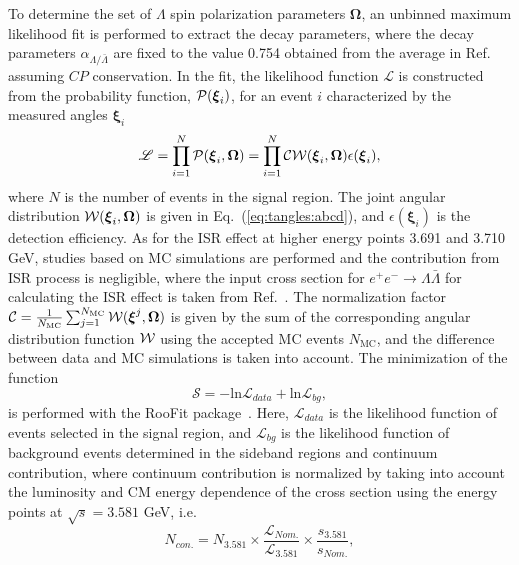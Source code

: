 \documentclass[a4paper,11pt]{article}
\begin{document}
To determine the set of $\Lambda$ spin polarization parameters $\boldsymbol{\Omega}$, an unbinned maximum likelihood fit is performed to extract the decay parameters, where the decay parameters $\alpha_{\Lambda/\bar\Lambda}$ are fixed to the value 0.754 obtained from the average in Ref.~\cite{BESIII:2022yprl} assuming $CP$ conservation.
In the fit,  the likelihood function $\mathscr{L}$ is constructed from the probability function, ${\cal{P}}({\boldsymbol{\xi}}_i)$, for an event $i$ characterized by the measured angles $\boldsymbol{\xi}_i$
\begin{equation}
\mathscr{L} = \prod_{i=1}^N {\cal{P}}({\boldsymbol{\xi}}_i, {\boldsymbol{\Omega}}) = \prod_{i=1}^N {\cal{C}}{\cal{W}}({\boldsymbol{\xi}}_i, {\boldsymbol{\Omega}})\epsilon(\boldsymbol{\xi}_i), 
\end{equation}
where $N$ is the number of events in the signal region. The joint angular distribution ${\cal{W}}({\boldsymbol{\xi}}_i, {\boldsymbol{\Omega}})$ is given in Eq.~(\ref{eq:tangles:abcd}), and $\epsilon(\boldsymbol{\xi}_i)$ is the detection efficiency.
As for the ISR effect at higher energy points {3.691 and 3.710 GeV, studies based on MC simulations are performed and the contribution from ISR process is negligible, where the input cross section for $e^+e^-\to\Lambda\bar\Lambda$ for calculating the ISR effect is taken from Ref.~\cite{borncs}.} 
The normalization factor $\mathcal{C}=\frac{1}{N_\mathrm{MC}}\sum_{j=1}^{N_\mathrm{MC}} {\cal{W}}({\boldsymbol{\xi}}^{j}, {\boldsymbol{\Omega}})$ is given by the sum of the corresponding angular distribution function $\cal{W}$ using the accepted MC events $N_\mathrm{MC}$, and the difference between data and MC simulations is taken into account. 
The minimization of the function
\begin{equation}
\mathscr{S} = -\mathrm{ln}\mathscr{L}_{data} + \mathrm{ln}\mathscr{L}_{bg},
\end{equation}
is performed with the RooFit package~\cite{Roofit}.
Here, $\mathscr{L}_{data}$ is the likelihood function of events selected in the signal region, and $\mathscr{L}_{bg}$ is the likelihood function of background events determined in the sideband regions and continuum contribution, where continuum contribution is normalized by taking into account the luminosity and CM energy dependence of the cross section using the energy points at $\sqrt{s} = 3.581$ GeV, i.e.
\begin{equation}
N_{con.}=N_{3.581}\times\frac{\mathcal{L}_{Nom.}}{\mathcal{L}_{3.581}}\times\frac{s_{3.581}}{s_{Nom.}},
\label{ctmbkg}
\end{equation}
\end{document}
